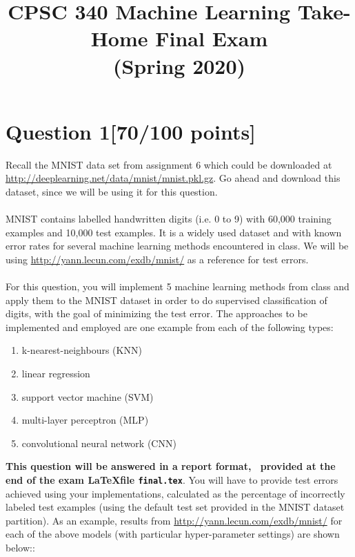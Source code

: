 \documentclass{article}
\begin{document}
\title{CPSC 340 Machine Learning Take-Home Final Exam\\ (Spring 2020)}
\date{}
\maketitle
\vspace{-5em}

\section*{Question 1\hspace{10cm}[70/100 points]}
Recall the MNIST data set from assignment 6 which could be downloaded at \url{http://deeplearning.net/data/mnist/mnist.pkl.gz}. Go ahead and download this dataset, since we will be using it for this question.\\
\\
MNIST contains labelled handwritten digits (i.e. 0 to 9) with 60,000 training examples and 10,000 test examples. It is a widely used dataset and with known error rates for several machine learning methods encountered in class. We will be using \url{http://yann.lecun.com/exdb/mnist/} as a reference for test errors.\\
\\
For this question, you will implement 5 machine learning methods from class and apply them to the MNIST dataset in order to do supervised classification of digits, with the goal of minimizing the test error. The approaches to be implemented and employed are one example from each of the following types:
\begin{enumerate}
    \item k-nearest-neighbours (KNN)
    \item linear regression
    \item support vector machine (SVM)
    \item multi-layer perceptron (MLP)
    \item convolutional neural network (CNN)
\end{enumerate}
\textbf{This question will be answered in a report format,  provided at the end of the exam \LaTeX file \texttt{final.tex}}. You will have to provide test errors achieved using your implementations, calculated as the percentage of incorrectly labeled test examples (using the default test set provided in the MNIST dataset partition). As an example, results from \url{http://yann.lecun.com/exdb/mnist/} for each of the above models (with particular hyper-parameter settings) are shown below::\\
\end{document}

